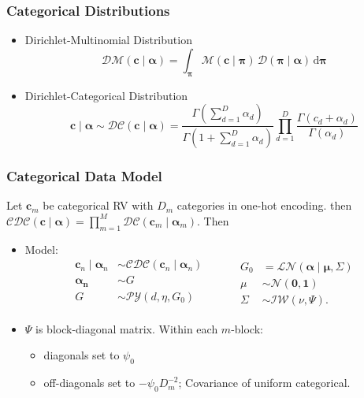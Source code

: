 \documentclass[aspectratio=169,10pt]{beamer}
\begin{document}
\begin{frame}
    \frametitle{Categorical Distributions}
    \begin{itemize}
        \item Dirichlet-Multinomial Distribution
            \[
            \mathcal{DM}(\bm{c}\mid\bm{\alpha}) = 
                \int_{\bm{\pi}}\mathcal{M}(\bm{c}\mid\bm{\pi})\,
                \mathcal{D}(\bm{\pi}\mid\bm{\alpha})\,\text{d}\bm{\pi}
            \]
        \item Dirichlet-Categorical Distribution
            \[
            \bm{c}\mid\bm{\alpha} \sim 
            \mathcal{DC}(\bm{c}\mid\bm{\alpha}) = 
            \frac{
                \Gamma(\sum_{d=1}^D \alpha_{d})
                }{
                \Gamma(1 + \sum_{d = 1}^D\alpha_{d})
                }
            \prod_{d = 1}^D 
            \frac{\Gamma(c_{d} + \alpha_{d})}{\Gamma(\alpha_{d})}
            \]
    \end{itemize}
\end{frame} %

\begin{frame}
    \frametitle{Categorical Data Model}
    Let $\bm{c}_m$ be categorical RV with $D_m$ categories in one-hot encoding.  
    then $\mathcal{CDC}(\bm{c}\mid\bm{\alpha}) = 
        \prod_{m = 1}^M \mathcal{DC}(\bm{c}_m\mid\bm{\alpha}_m)$.  
        Then
    \begin{itemize}
    \item Model:
    \[
    \begin{aligned}
      \bm{c}_n \mid \bm{\alpha}_n &\sim 
        \mathcal{CDC}\left(\bm{c}_n\mid\bm{\alpha}_n\right)\\
      \bm{\alpha_n} &\sim G\\
      G &\sim \mathcal{PY}\left(d, \eta, G_0\right)\\
      \end{aligned}
      ~\hspace{1cm}
      \begin{aligned}
      G_0 &= \mathcal{LN}\left(\bm{\alpha}\mid\bm{\mu},\Sigma\right)\\
      \mu &\sim \mathcal{N}\left(\bm{0},\bm{1}\right)\\
      \Sigma &\sim \mathcal{IW}\left(\nu, \Psi\right).
      \end{aligned}
      \]
    \item $\Psi$ is block-diagonal matrix.  Within each $m$-block:
    \begin{itemize}
        \item diagonals set to $\psi_0$
        \item off-diagonals set to $-\psi_0D_m^{-2}$; Covariance of uniform categorical.
    \end{itemize}
    \end{itemize}    
\end{frame} %
\end{document}

